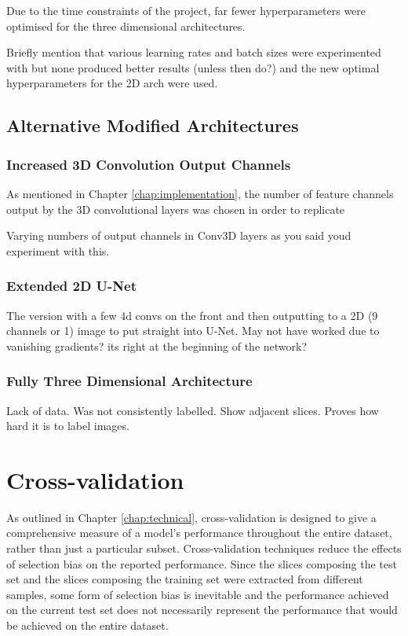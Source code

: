Due to the time constraints of the project, far fewer hyperparameters were optimised for the three dimensional architectures.

Briefly mention that various learning rates and batch sizes were experimented with but none produced better results (unless then do?) and the new optimal hyperparameters for the 2D arch were used.

\subsection{Alternative Modified Architectures}

\subsubsection{Increased 3D Convolution Output Channels}

As mentioned in Chapter \ref{chap:implementation}, the number of feature channels output by the 3D convolutional layers was chosen in order to replicate 

Varying numbers of output channels in Conv3D layers as you said youd experiment with this.

\subsubsection{Extended 2D U-Net}

The version with a few 4d convs on the front and then outputting to a 2D (9 channels or 1) image to put straight into U-Net. May not have worked due to vanishing gradients? its right at the beginning of the network?

\subsubsection{Fully Three Dimensional Architecture}

Lack of data. Was not consistently labelled. Show adjacent slices. Proves how hard it is to label images.

\section{Cross-validation}
\label{sec:evalcrossval}

As outlined in Chapter \ref{chap:technical}, cross-validation is designed to give a comprehensive measure of a model's performance throughout the entire dataset, rather than just a particular subset. Cross-validation techniques reduce the effects of selection bias on the reported performance. Since the slices composing the test set and the slices composing the training set were extracted from different samples, some form of selection bias is inevitable and the performance achieved on the current test set does not necessarily represent the performance that would be achieved on the entire dataset.


